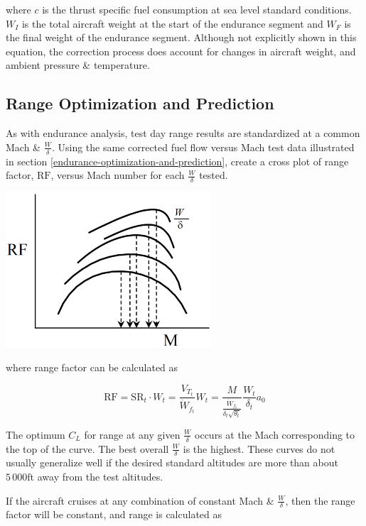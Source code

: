 \documentclass[
]{book}
\begin{document}
where \(c\) is the thrust specific fuel consumption at sea level standard
conditions. \(W_I\) is the total aircraft weight at the start of the endurance
segment and \(W_F\) is the final weight of the endurance segment. Although not
explicitly shown in this equation, the correction process does account for
changes in aircraft weight, and ambient pressure \& temperature.

\hypertarget{range-optimization-and-prediction-1}{%
\subsection{Range Optimization and Prediction}\label{range-optimization-and-prediction-1}}

As with endurance analysis, test day range results are standardized at a common
Mach \& \(\frac{W}{\delta}\). Using the same corrected fuel flow versus Mach test
data illustrated in section \ref{endurance-optimization-and-prediction}, create
a cross plot of range factor, \(\mathrm{RF}\), versus Mach number for each
\(\frac{W}{\delta}\) tested.

\includegraphics[width=3in,height=\textheight]{media/12/rng-factor-m-curve.png}

where range factor can be calculated as

\[
\mathrm{RF} = \mathrm{SR}_t \cdot W_t = \frac{V_{T_t}}{\dot{W}_{f_t}} W_t = \frac{M}{ \frac{\dot{W}_{f_t}}{\delta_t \sqrt{\theta_t}} } \frac{W_t}{\delta_t} a_0
\label{eq:rng-factor-w-delta}
\]

The optimum \(C_L\) for range at any given \(\frac{W}{\delta}\) occurs at the
Mach corresponding to the top of the curve. The best overall \(\frac{W}{\delta}\)
is the highest. These curves do not usually generalize well if the desired
standard altitudes are more than about \(5\,000 \text{ft}\) away from the test
altitudes.

If the aircraft cruises at any combination of constant Mach \& \(\frac{W}{\delta}\),
then the range factor will be constant, and range is calculated as
\end{document}
